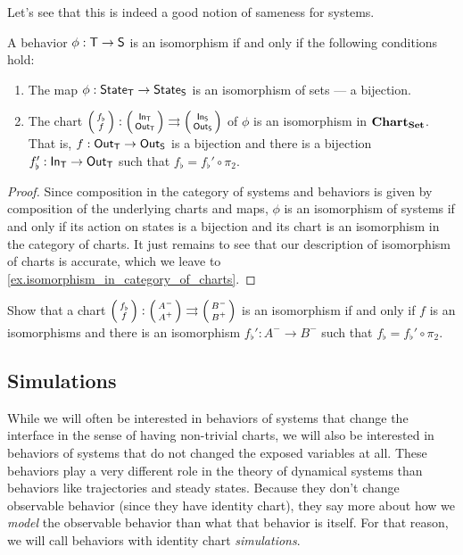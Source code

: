 \documentclass[DynamicalBook]{subfiles}
\begin{document}
Let's see that this is indeed a good notion of sameness for systems.
\begin{proposition}\label{prop.isomorphism_of_systems_discrete}
  A behavior $\phi : \mathsf{T} \to \mathsf{S}$ is an isomorphism if and only if the
  following conditions hold:
\begin{enumerate}
  \item The map $\phi : \mathsf{State}_{\mathsf{T}} \to \mathsf{State}_{\mathsf{S}}$ is an isomorphism of sets --- a
    bijection.
  \item The chart $\lens{f_{\flat}}{f} : \lens{\In{T}}{\Out{T}}
    \rightrightarrows \lens{\In{S}}{\Out{S}}$ of $\phi$ is an isomorphism in
    $\textbf{Chart}_{\textbf{Set}}$. That is, $f : \mathsf{Out}_{\mathsf{T}} \to \mathsf{Out}_{\mathsf{S}}$ is a bijection
    and there is a bijection $f_{\flat}' : \mathsf{In}_{\mathsf{T}} \to \mathsf{Out}_{\mathsf{T}}$ such that
    $f_{\flat} = f_{\flat}' \circ \pi_2$.
\end{enumerate}
\end{proposition}
\begin{proof}
  Since composition in the category of systems and behaviors is given by
  composition of the underlying charts and maps, $\phi$ is an isomorphism of
  systems if and only if its action on states is a bijection and its chart is an
  isomorphism in the category of charts. It just remains to see that our
  description of isomorphism of charts is accurate, which we leave to \cref{ex.isomorphism_in_category_of_charts}.
\end{proof}

\begin{exercise}\label{ex.isomorphism_in_category_of_charts}
  Show that a chart $\lens{f_{\flat}}{f} : \lens{A^-}{A^+}
    \rightrightarrows \lens{B^-}{B^+}$ is an isomorphism if and only if $f$ is
    an isomorphisms and there is an isomorphism $f_{\flat}' : A^- \to B^-$ such
    that $f_{\flat} = f_{\flat}' \circ \pi_2$. 
\end{exercise}



\subsection{Simulations}

While we will often be interested in behaviors of systems that change the
interface in the sense of having non-trivial charts, we will also be interested
in behaviors of systems that do not changed the exposed variables at all. These
behaviors play a very different role in the theory of dynamical systems than
behaviors like trajectories and steady states. Because they don't change
observable behavior (since they have identity chart), they say more about how we
\emph{model} the observable behavior than what that behavior is itself. For that
reason, we will call behaviors with identity chart \emph{simulations}.
\end{document}
